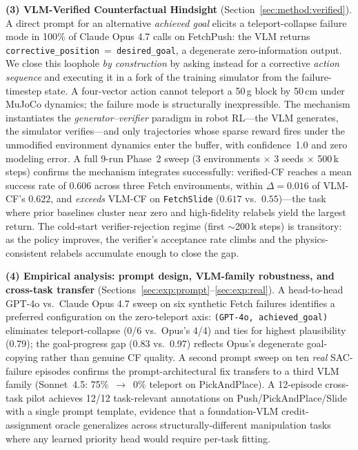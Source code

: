 \documentclass{article}
\begin{document}
\textbf{(3) VLM-Verified Counterfactual Hindsight} (Section~\ref{sec:method:verified}).
A direct prompt for an alternative \emph{achieved goal} elicits a teleport-collapse
failure mode in 100\% of Claude Opus 4.7 calls on FetchPush: the VLM returns
\texttt{corrective\_position}~=~\texttt{desired\_goal}, a degenerate
zero-information output. We close this loophole \emph{by construction} by
asking instead for a corrective \emph{action sequence} and executing it in
a fork of the training simulator from the failure-timestep state. A
four-vector action cannot teleport a 50\,g block by 50\,cm under MuJoCo
dynamics; the failure mode is structurally inexpressible. The mechanism
instantiates the \emph{generator--verifier} paradigm \citep{zha2025tango}
in robot RL---the VLM generates, the simulator verifies---and only
trajectories whose sparse reward fires under the unmodified environment
dynamics enter the buffer, with confidence~1.0 and zero modeling error.
A full 9-run Phase~2 sweep (3 environments $\times$ 3 seeds $\times$
500\,k steps) confirms the mechanism integrates successfully: verified-CF
reaches a mean success rate of $0.606$ across three Fetch environments,
within $\Delta\!=\!0.016$ of VLM-CF's $0.622$, and \emph{exceeds}
VLM-CF on \texttt{FetchSlide} ($0.617$ vs.\ $0.55$)---the task where
prior baselines cluster near zero and high-fidelity relabels yield the
largest return. The cold-start verifier-rejection regime (first
$\sim$200\,k steps) is transitory: as the policy improves, the verifier's
acceptance rate climbs and the physics-consistent relabels accumulate
enough to close the gap.

\textbf{(4) Empirical analysis: prompt design, VLM-family robustness, and
cross-task transfer} (Sections~\ref{sec:exp:prompt}--\ref{sec:exp:real}).
A head-to-head GPT-4o vs.\ Claude Opus 4.7 sweep on six synthetic Fetch
failures identifies a preferred configuration on the zero-teleport axis:
\texttt{(GPT-4o, achieved\_goal)} eliminates teleport-collapse (0/6 vs.\
Opus's 4/4) and ties for highest plausibility (0.79); the goal-progress
gap (0.83 vs.\ 0.97) reflects Opus's degenerate goal-copying rather than
genuine CF quality. A second
prompt sweep on ten \emph{real} SAC-failure episodes confirms the
prompt-architectural fix transfers to a third VLM family
(Sonnet~4.5: 75\%~$\to$~0\% teleport on PickAndPlace). A 12-episode
cross-task pilot achieves 12/12 task-relevant annotations on
Push/PickAndPlace/Slide with a single prompt template, evidence that a
foundation-VLM credit-assignment oracle generalizes across structurally-different
manipulation tasks where any learned priority head would require per-task
fitting.
\end{document}
